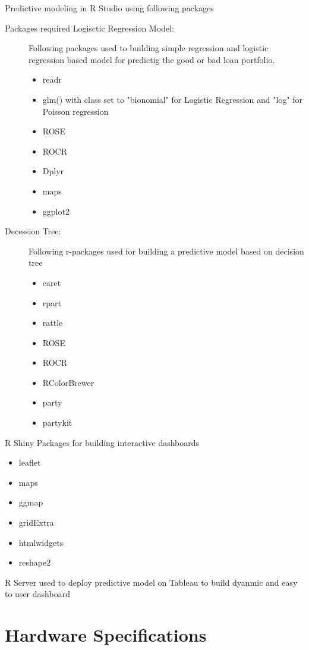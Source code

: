 Predictive modeling in R Studio using following packages
\begin{description}
  \item[Packages required Logisctic Regression Model:] Following packages used to building simple regression and logistic regression based model for predictig the good or bad loan portfolio.
   \begin{itemize}
        \item readr
        \item glm() with class set to "bionomial" for Logistic Regression and "log" for Poisson regression
        \item ROSE 
        \item ROCR
        \item Dplyr
        \item maps
        \item ggplot2
    \end{itemize}
  \item[Decession Tree:] Following r-packages used for building a predictive model based on decision tree
    \begin{itemize}
        \item caret
        \item rpart
        \item rattle
        \item ROSE
        \item ROCR
        \item RColorBrewer
        \item party
        \item partykit
    \end{itemize}

\end{description}



R Shiny Packages for building interactive dashboards
\begin{itemize}
  \item leaflet
  \item maps
  \item ggmap
  \item gridExtra
  \item htmlwidgets
  \item reshape2
\end{itemize}

R Server used to deploy predictive model on Tableau to build dyanmic and easy to user dashboard

\section{Hardware Specifications}

